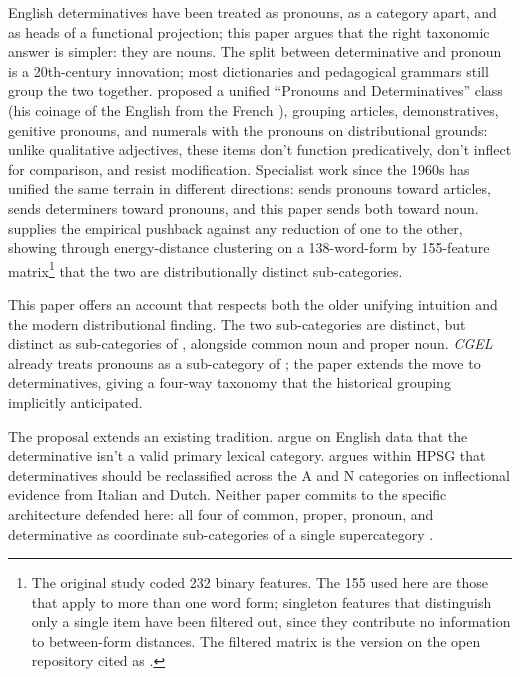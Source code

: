 \documentclass[12pt]{article}
\begin{document}
English determinatives have been treated as pronouns, as a category apart, and as heads of a functional projection; this paper argues that the right taxonomic answer is simpler: they are nouns. The split between determinative and pronoun is a 20th-century innovation; most dictionaries and pedagogical grammars still group the two together. \textcite{palmer1924} proposed a unified \enquote{Pronouns and Determinatives} class (his coinage of the English  from the French ), grouping articles, demonstratives, genitive pronouns, and numerals with the pronouns on distributional grounds: unlike qualitative adjectives, these items don't function predicatively, don't inflect for comparison, and resist modification. Specialist work since the 1960s has unified the same terrain in different directions: \citet{postal1966} sends pronouns toward articles, \citet{hudson2004determiners} sends determiners toward pronouns, and this paper sends both toward noun. \citet{anon2021dist} supplies the empirical pushback against any reduction of one to the other, showing through energy-distance clustering on a 138-word-form by 155-feature matrix\footnote{The original study coded 232 binary features. The 155 used here are those that apply to more than one word form; singleton features that distinguish only a single item have been filtered out, since they contribute no information to between-form distances. The filtered matrix is the version on the open repository cited as \citep{anon2021matrix}.} that the two are distributionally distinct sub-categories.

This paper offers an account that respects both the older unifying intuition and the modern distributional finding. The two sub-categories are distinct, but distinct as sub-categories of , alongside common noun and proper noun. \textit{CGEL} \citep{huddleston2002} already treats pronouns as a sub-category of ; the paper extends the move to determinatives, giving a four-way taxonomy that the historical grouping implicitly anticipated.

The proposal extends an existing tradition. \textcite{spinillo2000determiners,spinillo2004reconceptualising} argue on English data that the determinative isn't a valid primary lexical category. \textcite{vaneynde2003determiner} argues within HPSG that determinatives should be reclassified across the A and N categories on inflectional evidence from Italian and Dutch. Neither paper commits to the specific architecture defended here: all four of common, proper, pronoun, and determinative as coordinate sub-categories of a single supercategory .
\end{document}
